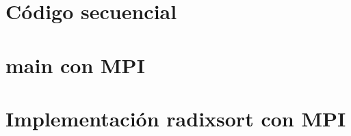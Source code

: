 \documentclass[a4paper]{article}
\begin{document}
\appendix

\section{Código secuencial}\label{secuencial.c}



\section{main con MPI}\label{main.c}


\section{Implementación radixsort con MPI}\label{radixsort_mpi.c}

\end{document}
